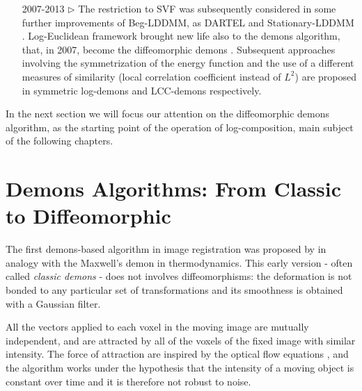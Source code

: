 \begin{enumerate}
	\item[2007-2013 $\triangleright$] The restriction to SVF was subsequently considered in some further improvements of Beg-LDDMM, as DARTEL \cite{Ashburner:07} and Stationary-LDDMM  \cite{hernandez2007registration}. 
	Log-Euclidean framework brought new life also to the demons algorithm, that, in 2007, become the diffeomorphic demons \cite{vercauteren2007non}.
	Subsequent approaches involving the symmetrization of the energy function and the use of a different measures of similarity (local correlation coefficient instead of $L^{2}$) are proposed in symmetric log-demons \cite{vercauteren08} and LCC-demons \cite{lorenzi2013lcc} respectively.
	
\end{enumerate}
\noindent
In the next section we will focus our attention on the diffeomorphic demons algorithm, as the starting point of the operation of log-composition, main subject of the following chapters.

\section{Demons Algorithms: From Classic to Diffeomorphic}

The first demons-based algorithm in image registration was proposed by \cite{thirion1998image} in analogy with the Maxwell's demon in thermodynamics. This early version - often called \emph{classic demons} - does not involves diffeomorphisms: the deformation is not bonded to any particular set of transformations and its smoothness is obtained with a Gaussian filter.

All the vectors applied to each voxel in the moving image are mutually independent, and are attracted by all of the voxels of the fixed image with similar intensity. The force of attraction are inspired by the optical flow equations \cite{horn1981determining}, and the algorithm works under the hypothesis that the intensity of a moving object is constant over time and it is therefore not robust to noise. 

